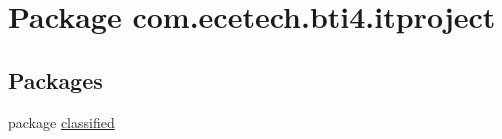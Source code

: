 \hypertarget{namespacecom_1_1ecetech_1_1bti4_1_1itproject}{}\section{Package com.\+ecetech.\+bti4.\+itproject}
\label{namespacecom_1_1ecetech_1_1bti4_1_1itproject}
\subsection*{Packages}
\begin{DoxyCompactItemize}
\item 
package \hyperlink{namespacecom_1_1ecetech_1_1bti4_1_1itproject_1_1classified}{classified}
\end{DoxyCompactItemize}
